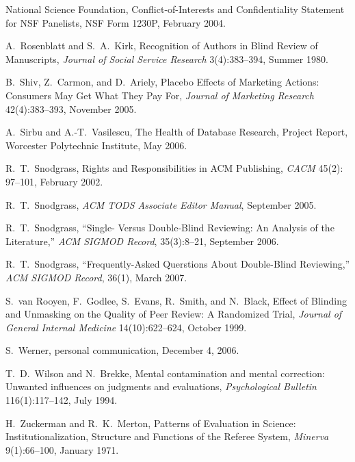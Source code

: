 \documentclass[acmtods,acmnow]{acmtrans2m}
\begin{document}
\begin{thebibliography}{}
{\sc National Science Foundation}, Conflict-of-Interests and Confidentiality
Statement for NSF Panelists, NSF Form 1230P, February 2004.

{\sc A.~Rosenblatt and S.~A.~Kirk}, Recognition of Authors in Blind Review of
Manuscripts, {\em Journal of Social Service Research} 3(4):383--394,
Summer 1980.

{\sc B.~Shiv, Z.~Carmon, and D.~Ariely}, Placebo Effects of Marketing
Actions: Consumers May Get What They Pay For, {\em Journal of Marketing
  Research} 42(4):383--393, November 2005.

{\sc A.~Sirbu and A.-T.~Vasilescu}, The Health of Database Research, Project
Report, Worcester Polytechnic Institute, May 2006.

{\sc R.~T.~Snodgrass}, Rights and Responsibilities in ACM Publishing,
{\em CACM} 45(2): 97--101, February 2002.

{\sc R.~T.~Snodgrass}, {\em {\em ACM TODS} Associate Editor Manual},
September 2005.

{\sc R.~T.~Snodgrass}, ``Single- Versus Double-Blind Reviewing: An Analysis of
the Literature,'' {\em ACM SIGMOD Record}, 35(3):8--21, September 2006.

{\sc R.~T.~Snodgrass}, ``Frequently-Asked Querstions About Double-Blind Reviewing,'' {\em ACM SIGMOD Record}, 36(1), March 2007.

{\sc S.~van Rooyen, F.~Godlee, S.~Evans, R.~Smith, and N.~Black}, Effect of
Blinding and Unmasking on the Quality of Peer Review: A Randomized Trial,
{\em Journal of General Internal Medicine} 14(10):622--624, October 1999.

{\sc S.~Werner}, personal communication, December 4, 2006.

{\sc T.~D.~Wilson and N.~Brekke}, Mental contamination and mental
correction: Unwanted influences on judgments and evaluations, {\em
  Psychological Bulletin} 116(1):117--142, July 1994.

{\sc H.~Zuckerman and R.~K.~Merton}, Patterns of Evaluation in Science:
Institutionalization, Structure and Functions of the Referee System,
{\em Minerva} 9(1):66--100, January 1971.

\end{thebibliography}
\end{document}
